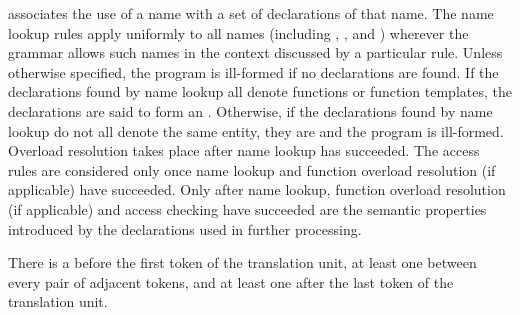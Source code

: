 \pnum
{} associates the use of a name
with a set of declarations of that name.
The name lookup rules apply uniformly to all names (including
,
, and
) wherever the grammar allows
such names in the context discussed by a particular rule.
Unless otherwise specified,
the program is ill-formed if no declarations are found.
If the declarations found by name lookup
all denote functions or function templates,
the declarations are said to form an .
Otherwise,
if the declarations found by name lookup do not all denote the same entity,
%
they are  and the program is ill-formed.
Overload resolution
takes place after name lookup has succeeded. The access rules
are considered only once name lookup and
function overload resolution (if applicable) have succeeded. Only after
name lookup, function overload resolution (if applicable) and access
checking have succeeded
are the semantic properties introduced by the declarations
used in further processing.

\pnum
There is a 
before the first token of the translation unit,
at least one between every pair of adjacent tokens, and
at least one after the last token of the translation unit.

